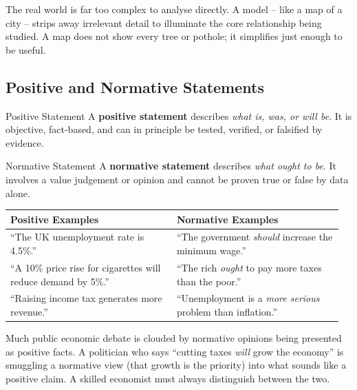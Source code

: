 \documentclass[11pt, a4paper, twoside]{book}
\begin{document}
The real world is far too complex to analyse directly. A model -- like a map of a city -- strips away irrelevant detail to illuminate the core relationship being studied. A map does not show every tree or pothole; it simplifies just enough to be useful.

\subsection{Positive and Normative Statements}

\begin{keyterm}{Positive Statement}
A \textbf{positive statement} describes \emph{what is, was, or will be}. It is objective, fact-based, and can in principle be tested, verified, or falsified by evidence.
\end{keyterm}

\begin{keyterm}{Normative Statement}
A \textbf{normative statement} describes \emph{what ought to be}. It involves a value judgement or opinion and cannot be proven true or false by data alone.
\end{keyterm}

\begin{tcolorbox}[
  enhanced, colback=LightBlue, colframe=NavyPrimary,
  arc=0pt, boxrule=0.7pt,
  left=8pt, right=8pt, top=6pt, bottom=6pt
]
\begin{tabular}{@{}>{\RaggedRight\arraybackslash}p{0.48\linewidth}>{\RaggedRight\arraybackslash}p{0.48\linewidth}@{}}
\textbf{\color{NavyPrimary}Positive Examples} & \textbf{\color{NavyPrimary}Normative Examples}\\
\midrule
``The UK unemployment rate is 4.5\%.'' & ``The government \emph{should} increase the minimum wage.''\\
``A 10\% price rise for cigarettes will reduce demand by 5\%.'' & ``The rich \emph{ought} to pay more taxes than the poor.''\\
``Raising income tax generates more revenue.'' & ``Unemployment is a \emph{more serious} problem than inflation.''\\
\end{tabular}
\end{tcolorbox}

Much public economic debate is clouded by normative opinions being presented as positive facts. A politician who says ``cutting taxes \emph{will} grow the economy'' is smuggling a normative view (that growth is the priority) into what sounds like a positive claim. A skilled economist must always distinguish between the two.
\end{document}
